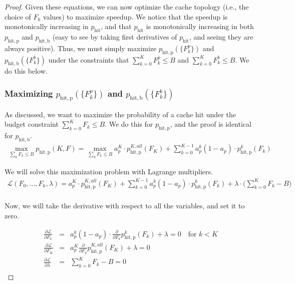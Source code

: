 \begin{proof}
Given these equations, we can now optimize the cache topology (i.e., the choice of $F_k$ values) to maximize speedup.
We notice that the speedup is monotonically increasing in $p_{\mathrm{hit}}$, and that $p_{\mathrm{hit}}$ is monotonically increasing in both $p_{\mathrm{hit,p}}$ and $p_{\mathrm{hit,b}}$ (easy to see by taking first derivatives of $p_{\mathrm{hit}}$, and seeing they are always positive).
Thus, we must simply maximize $p_{\mathrm{hit,p}}(\{F_k^p\})$ and $p_{\mathrm{hit,b}}(\{F_k^b\})$ under the constraints that $\sum_{k=0}^K F_k^p \leq B$ and $\sum_{k=0}^K F_k^b \leq B$.
We do this below.

\subsubsection{Maximizing $p_{\mathrm{hit,p}}(\{F_k^p\})$ and $p_{\mathrm{hit,b}}(\{F_k^b\})$}

\noindent As discussed, we want to maximize the probability of a cache hit under the budget constraint $\sum_{k=0}^K F_k \leq B$.
We do this for $p_{\mathrm{hit,p}}$, and the proof is identical for $p_{\mathrm{hit,b}}$.
\begin{eqnarray*}
\max_{\sum_k F_k \leq B} p_{\mathrm{hit,p}}(K,F) = \max_{\sum_k F_k \leq B} a_p^K  \cdot p_{\mathrm{hit,p}}^{K,all}(F_K) + \sum_{k=0}^{K-1} a_p^k (1-a_p) \cdot p_{\mathrm{hit,p}}^k(F_k)
\end{eqnarray*}

\noindent  We will solve this maximization problem with Lagrange multipliers.
\begin{eqnarray*}
\mathcal{L}(F_0, \ldots, F_k, \lambda) = a_p^K  \cdot p_{\mathrm{hit,p}}^{K,all}(F_K) + \sum_{k=0}^{K-1} a_p^k (1-a_p) \cdot p_{\mathrm{hit,p}}^k(F_k) + \lambda \cdot \Big(\sum_{k=0}^K F_k - B\Big) \\
\end{eqnarray*}

\noindent Now, we will take the derivative with respect to all the variables, and set it to zero.

\begin{eqnarray*}
\frac{\partial \mathcal{L}}{\partial F_k} &=& a_p^k(1-a_p) \cdot \frac{\partial }{\partial F_k} p_{\mathrm{hit,p}}^k(F_k) + \lambda = 0  \quad \text{for } k < K \\
\frac{\partial \mathcal{L}}{\partial F_K} &=& a_p^K \frac{\partial }{\partial F_k} p_{\mathrm{hit,p}}^{K,all}(F_K) + \lambda = 0 \\
\frac{\partial \mathcal{L}}{\partial \lambda} &=& \sum_{k=0}^K F_k - B = 0 \\
\end{eqnarray*}


\end{proof}
